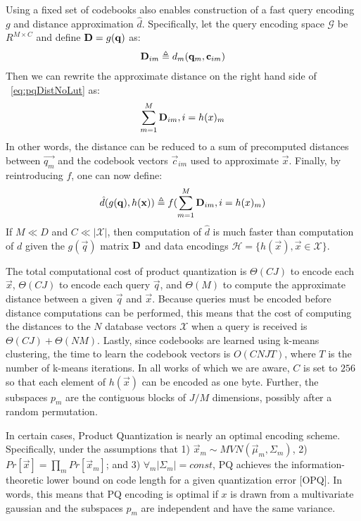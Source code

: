 Using a fixed set of codebooks also enables construction of a fast query encoding $g$ and distance approximation $\hat{d}$. Specifically, let the query encoding space $\mathcal{G}$ be $R^{M \times C}$ and define $\mathbf{D} = g(\mathbf{q})$ as: %
\begin{align}
    \mathbf{D}_{im} \triangleq d_m(\mathbf{q}_m, \mathbf{c}_{im})
\end{align}
Then we can rewrite the approximate distance on the right hand side of ~\ref{eq:pqDistNoLut} as:
\begin{align} \label{eq:pqDist}
        \sum_{m=1}^M \mathbf{D}_{im}, i = h(x)_m
\end{align}
In other words, the distance can be reduced to a sum of precomputed distances between $\vec{q_m}$ and the codebook vectors $\vec{c}_{im}$ used to approximate $\vec{x}$. Finally, by reintroducing $f$, one can now define:
\begin{align} \label{eq:pq_dhat}
    \hat{d}(g(\mathbf{q}), h(\mathbf{x})) \triangleq f(\sum_{m=1}^M \mathbf{D}_{im}, i = h(x)_m)
\end{align}
If $M \ll D$ and $C \ll |\mathcal{X}|$, then computation of $\hat{d}$ is much faster than computation of $d$ given the $g(\vec{q})$ matrix $\mathbf{D}$ and data encodings $\mathcal{H} = \{h(\vec{x}), \vec{x} \in \mathcal{X} \}$.

The total computational cost of product quantization is $\Theta(CJ)$ to encode each $\vec{x}$, $\Theta(CJ)$ to encode each query $\vec{q}$, and $\Theta(M)$ to compute the approximate distance between a given $\vec{q}$ and $\vec{x}$. Because queries must be encoded before distance computations can be performed, this means that the cost of computing the distances to the $N$ database vectors $\mathcal{X}$ when a query is received is $\Theta(CJ) + \Theta(NM)$. Lastly, since codebooks are learned using k-means clustering, the time to learn the codebook vectors is $O(CNJT)$, where $T$ is the number of k-means iterations. In all works of which we are aware, $C$ is set to $256$ so that each element of $h(\vec{x})$ can be encoded as one byte. Further, the subspaces $p_m$ are the contiguous blocks of $J/M$ dimensions, possibly after a random permutation.

In certain cases, Product Quantization is nearly an optimal encoding scheme. Specifically, under the assumptions that 1) $\vec{x}_m \sim MVN(\vec{\mu}_m, \Sigma_m)$, 2) $Pr[\vec{x}] = \prod_m Pr[\vec{x}_m]$; and 3) $\forall_m |\Sigma_m| = \textit{const}$, PQ achieves the information-theoretic lower bound on code length for a given quantization error [OPQ]. In words, this means that PQ encoding is optimal if $x$ is drawn from a multivariate gaussian and the subspaces $p_m$ are independent and have the same variance.


